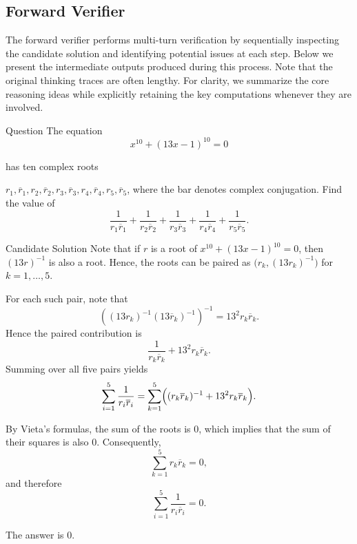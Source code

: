 \documentclass[11pt]{article}
\begin{document}
\subsection{Forward Verifier}

The forward verifier performs multi-turn verification by sequentially inspecting
the candidate solution and identifying potential issues at each step.
Below we present the intermediate outputs produced during this process.
Note that the original thinking traces are often lengthy.
For clarity, we summarize the core reasoning ideas while explicitly retaining
the key computations whenever they are involved.

\begin{exbox}{Question}
The equation
\[
x^{10} + (13x - 1)^{10} = 0
\]

has ten complex roots

$r_1, \overline{r}_1, r_2, \overline{r}_2, r_3, \overline{r}_3,
 r_4, \overline{r}_4, r_5, \overline{r}_5$,
where the bar denotes complex conjugation.
Find the value of
\[
\frac{1}{r_1 \overline{r}_1}
+ \frac{1}{r_2 \overline{r}_2}
+ \frac{1}{r_3 \overline{r}_3}
+ \frac{1}{r_4 \overline{r}_4}
+ \frac{1}{r_5 \overline{r}_5}.
\]
\end{exbox}
\begin{exbox}{Candidate Solution}
Note that if $r$ is a root of $x^{10}+(13x-1)^{10}=0$, then $(13r)^{-1}$ is also a root.
Hence, the roots can be paired as $\bigl(r_k,(13r_k)^{-1}\bigr)$ for $k=1,\dots,5$.

For each such pair, note that
\[
\left((13r_k)^{-1}(13\overline r_k)^{-1}\right)^{-1}
= 13^2 r_k\overline r_k .
\]
Hence the paired contribution is
\[
\frac{1}{r_k\overline r_k} + 13^2 r_k\overline r_k .
\]
Summing over all five pairs yields
\[
\sum_{i=1}^{5}\frac{1}{r_i\overline r_i}
= \sum_{k=1}^{5}\Bigl((r_k\overline r_k)^{-1} + 13^2 r_k\overline r_k\Bigr).
\]

By Vieta’s formulas, the sum of the roots is $0$, which implies that the sum of
their squares is also $0$. Consequently,
\[
\sum_{k=1}^{5} r_k\overline r_k = 0,
\]
and therefore
\[
\sum_{i=1}^{5}\frac{1}{r_i\overline r_i} = 0.
\]

The answer is $\boxed{0}$.
\end{exbox}
\end{document}
